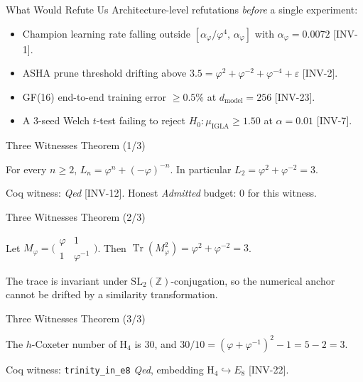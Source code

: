 \documentclass[10pt,aspectratio=169]{beamer}
\newcommand{\citetheorem}[1]{[\textsc{#1}]}
\begin{document}
\begin{frame}{What Would Refute Us}
  Architecture-level refutations \emph{before} a single experiment:
  \begin{itemize}
    \item Champion learning rate falling outside $[\alpha_{\varphi}/\varphi^{4},\,\alpha_{\varphi}]$ with $\alpha_{\varphi}=0{.}0072$ \citetheorem{INV-1}.
    \item ASHA prune threshold drifting above $3{.}5=\varphi^{2}+\varphi^{-2}+\varphi^{-4}+\varepsilon$ \citetheorem{INV-2}.
    \item GF(16) end-to-end training error $\geq 0{.}5\%$ at $d_{\mathrm{model}}=256$ \citetheorem{INV-23}.
    \item A 3-seed Welch $t$-test failing to reject $H_{0}\!:\mu_{\mathrm{IGLA}}\geq 1{.}50$ at $\alpha=0{.}01$ \citetheorem{INV-7}.
  \end{itemize}
\end{frame}

\begin{frame}{Three Witnesses Theorem (1/3)}
  \begin{theorem}
    For every $n\!\geq\!2$, $L_{n}=\varphi^{n}+(-\varphi)^{-n}$.
    In particular $L_{2}=\varphi^{2}+\varphi^{-2}=3$.
  \end{theorem}
  Coq witness:  \emph{Qed} \citetheorem{INV-12}.
  Honest \emph{Admitted} budget: $0$ for this witness.
\end{frame}

\begin{frame}{Three Witnesses Theorem (2/3)}
  \begin{theorem}
    Let $M_{\varphi}=\bigl(\begin{smallmatrix}\varphi&1\\1&\varphi^{-1}\end{smallmatrix}\bigr)$.
    Then $\operatorname{Tr}(M_{\varphi}^{2})=\varphi^{2}+\varphi^{-2}=3$.
  \end{theorem}
  The trace is invariant under $\mathrm{SL}_{2}(\mathbb{Z})$-conjugation, so the
  numerical anchor cannot be drifted by a similarity transformation.
\end{frame}

\begin{frame}{Three Witnesses Theorem (3/3)}
  \begin{theorem}
    The $h$-Coxeter number of $\mathrm{H}_{4}$ is $30$, and
    $30/10 = (\varphi+\varphi^{-1})^{2}-1 = 5-2 = 3$.
  \end{theorem}
  Coq witness: \texttt{trinity\_in\_e8} \emph{Qed}, embedding
  $\mathrm{H}_{4}\hookrightarrow E_{8}$ \citetheorem{INV-22}.
\end{frame}
\end{document}
